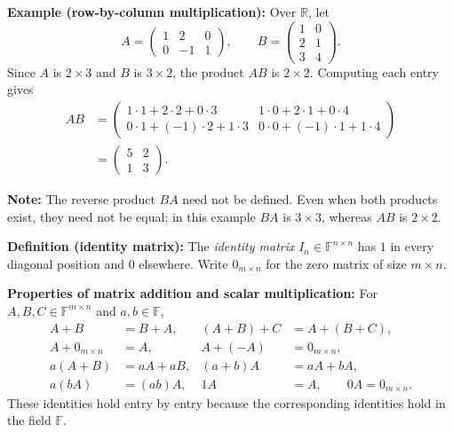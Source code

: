 \documentclass[a4paper,11pt,abstract=true]{scrartcl}
\theoremstyle{dotlessP}
\theoremstyle{dotlessS}
\theoremstyle{remark}
\theoremstyle{definition}
\begin{document}
\begin{example_box}
\textbf{Example (row-by-column multiplication):} Over $\mathbb{R}$,
let
\[
A=\begin{pmatrix}1&2&0\\0&-1&1\end{pmatrix},
\qquad B=\begin{pmatrix}1&0\\2&1\\3&4\end{pmatrix}.
\]
Since $A$ is $2\times3$ and $B$ is $3\times2$, the product $AB$ is
$2\times2$. Computing each entry gives
\[
\begin{aligned}
AB
&=\begin{pmatrix}
1\cdot1+2\cdot2+0\cdot3 & 1\cdot0+2\cdot1+0\cdot4\\
0\cdot1+(-1)\cdot2+1\cdot3 & 0\cdot0+(-1)\cdot1+1\cdot4
\end{pmatrix}\\[4pt]
&=\begin{pmatrix}5&2\\1&3\end{pmatrix}.
\end{aligned}
\]
\end{example_box}

\begin{remark_box}
\textbf{Note:} The reverse product $BA$ need not
be defined. Even when both products exist, they need not be equal;
in this example $BA$ is $3\times3$, whereas $AB$ is $2\times2$.
\end{remark_box}

\begin{claim_box}
\textbf{Definition (identity matrix):} The \emph{identity matrix}
$I_n\in\mathbb{F}^{n\times n}$ has $1$ in every diagonal position
and $0$ elsewhere. Write $0_{m\times n}$ for the zero matrix of size
$m\times n$.
\end{claim_box}

\begin{claim_box}
\textbf{Properties of matrix addition and scalar multiplication:}
For $A,B,C\in\mathbb{F}^{m\times n}$ and $a,b\in\mathbb{F}$,
\[
\begin{aligned}
A+B&=B+A, & (A+B)+C&=A+(B+C),\\
A+0_{m\times n}&=A, & A+(-A)&=0_{m\times n},\\
a(A+B)&=aA+aB, & (a+b)A&=aA+bA,\\
a(bA)&=(ab)A, & 1A&=A,\qquad 0A=0_{m\times n}.
\end{aligned}
\]
These identities hold entry by entry because the corresponding
identities hold in the field $\mathbb{F}$.
\end{claim_box}
\end{document}
